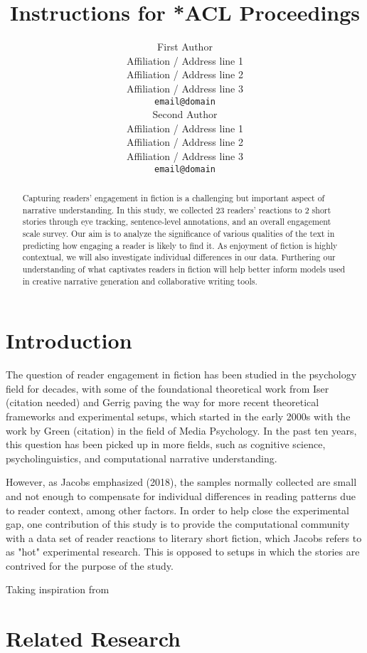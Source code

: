 \documentclass[11pt]{article}
\title{Instructions for *ACL Proceedings}
\author{First Author \\
  Affiliation / Address line 1 \\
  Affiliation / Address line 2 \\
  Affiliation / Address line 3 \\
  \texttt{email@domain} \\\And
  Second Author \\
  Affiliation / Address line 1 \\
  Affiliation / Address line 2 \\
  Affiliation / Address line 3 \\
  \texttt{email@domain} \\}
\begin{document}
\maketitle
\begin{abstract}
Capturing readers' engagement in fiction is a challenging but important aspect of narrative understanding. In this study, we collected 23 readers’ reactions to 2 short stories through eye tracking, sentence-level annotations, and an overall engagement scale survey. Our aim is to analyze the significance of various qualities of the text in predicting how engaging a reader is likely to find it. As enjoyment of fiction is highly contextual, we will also investigate individual differences in our data. Furthering our understanding of what captivates readers in fiction will help better inform models used in creative narrative generation and collaborative writing tools.

\end{abstract}

\section{Introduction}

The question of reader engagement in fiction has been studied in the psychology field for decades, with some of the foundational theoretical work from Iser (citation needed) and Gerrig paving the way for more recent theoretical frameworks and experimental setups, which started in the early 2000s with the work by Green (citation) in the field of Media Psychology. In the past ten years, this question has been picked up in more fields, such as cognitive science, psycholinguistics, and computational narrative understanding.

However, as Jacobs emphasized (2018), the samples normally collected are small and not enough to compensate for individual differences in reading patterns due to reader context, among other factors. In order to help close the experimental gap, one contribution of this study is to provide the computational community with a data set of reader reactions to literary short fiction, which Jacobs refers to as "hot" experimental research. This is opposed to setups in which the stories are contrived for the purpose of the study.

Taking inspiration from 

\section{Related Research}
\end{document}
